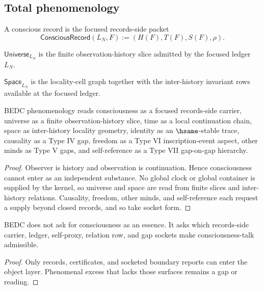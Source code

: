 \subsection{Total phenomenology}
\label{subsec:philosophy-total-phenomenology}

\begin{definition}
\label{def:philosophy-conscious-record-total}
A conscious record is the focused records-side packet
$$
\mathsf{ConsciousRecord}(L_N,F) := (H(F),T(F),S(F),\rho).
$$
\end{definition}

\begin{definition}
\label{def:philosophy-universe-slice-total}
\(\mathsf{Universe}_{L_N}\) is the finite observation-history slice
admitted by the focused ledger \(L_N\).
\end{definition}

\begin{definition}
\label{def:philosophy-space-reading-total}
\(\mathsf{Space}_{L_N}\) is the locality-cell graph together with the
inter-history invariant rows available at the focused ledger.
\end{definition}

\begin{theorem}
\label{thm:philosophy-phenomenology-synthesis-total}
BEDC phenomenology reads consciousness as a focused records-side
carrier, universe as a finite observation-history slice, time as a
local continuation chain, space as inter-history locality geometry,
identity as an \(\hsame\)-stable trace, causality as a Type IV gap,
freedom as a Type VI inscription-event aspect, other minds as Type V
gaps, and self-reference as a Type VII gap-on-gap hierarchy.
\end{theorem}
\begin{proof}
Observer is history and observation is continuation. Hence
consciousness cannot enter as an independent substance. No global
clock or global container is supplied by the kernel, so universe and
space are read from finite slices and inter-history relations.
Causality, freedom, other minds, and self-reference each request a
supply beyond closed records, and so take socket form.
\end{proof}

\begin{corollary}
\label{cor:philosophy-hard-problem-audit-question-total}
BEDC does not ask for consciousness as an essence. It asks which
records-side carrier, ledger, self-proxy, relation row, and gap sockets
make consciousness-talk admissible.
\end{corollary}
\begin{proof}
Only records, certificates, and socketed boundary reports can enter the
object layer. Phenomenal excess that lacks those surfaces remains a
gap or reading.
\end{proof}

